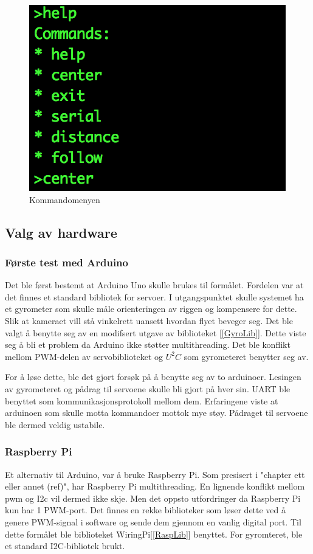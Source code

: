 \begin{figure}[h!]
	\centering
	\includegraphics[scale=0.8]{img/command-menu.png}
	\caption{Kommandomenyen}
	\label{fig:commandmenu}
\end{figure}


\subsection{Valg av hardware}
\subsubsection{Første test med Arduino}
Det ble først bestemt at Arduino Uno skulle brukes til formålet. Fordelen var at det finnes et standard bibliotek for servoer. I utgangspunktet skulle systemet ha et gyrometer som skulle måle orienteringen av riggen og kompensere for dette. Slik at kameraet vill stå vinkelrett uansett hvordan flyet beveger seg. Det ble valgt å benytte seg av en modifsert utgave av biblioteket [\ref{GyroLib}]. Dette viste seg å bli et problem da Arduino ikke støtter multithreading. Det ble konflikt mellom PWM-delen av servobiblioteket og $U^2C$ som gyrometeret benytter seg av.

For å løse dette, ble det gjort forsøk på å benytte seg av to arduinoer. Lesingen av gyrometeret og pådrag til servoene skulle bli gjort på hver sin. UART ble benyttet som kommunikasjonsprotokoll mellom dem. Erfaringene viste at arduinoen som skulle motta kommandoer mottok mye støy. Pådraget til servoene ble dermed veldig ustabile. 

\subsubsection{Raspberry Pi}
Et alternativ til Arduino, var å bruke Raspberry Pi. Som presisert i "chapter ett eller annet (ref)", har Raspberry Pi multithreading. En lignende konflikt mellom pwm og I2c vil dermed ikke skje. Men det oppsto utfordringer da Raspberry Pi kun har 1 PWM-port. Det finnes en rekke biblioteker som løser dette ved å genere PWM-signal i software og sende dem gjennom en vanlig digital port. Til dette formålet ble biblioteket WiringPi[\ref{RaspLib}] benyttet. For gyromteret, ble et standard I2C-bibliotek brukt. 

